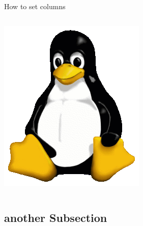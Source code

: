 \documentclass[]{beamer}
\begin{document}
\begin{frame}{How to set columns}
\begin{columns}[T]
\begin{column}{.45\textwidth}
      \includegraphics[width=.9\textwidth]{pictures/Tux}
    \end{column}
  \end{columns}
\end{frame}

\subsection{another Subsection}
\end{document}
